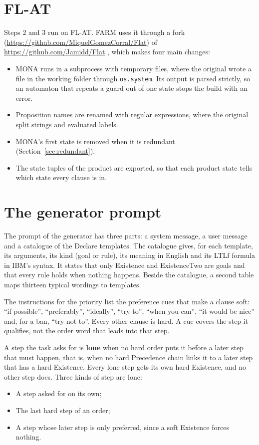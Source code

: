 \documentclass[11pt,english,listoffigures,listoftables]{tfgetsinf}
\begin{document}
\section{FL-AT}
Steps 2 and 3 run on FL-AT. FARM uses it through a fork (\url{https://github.com/MiquelGomezCorral/Flat}) of \url{https://github.com/Jamidd/Flat} \cite{flat_code}, which makes four main changes:
\begin{itemize}
    \item MONA runs in a subprocess with temporary files, where the original wrote a file in the working folder through \texttt{os.system}. Its output is parsed strictly, so an automaton that repeats a guard out of one state stops the build with an error.
    \item Proposition names are renamed with regular expressions, where the original split strings and evaluated labels.
    \item MONA's first state is removed when it is redundant (Section~\ref{sec:redundant}).
    \item The state tuples of the product are exported, so that each product state tells which state every clause is in.
\end{itemize}

\section{The generator prompt}
The prompt of the generator has three parts: a system message, a user message and a catalogue of the Declare templates. The catalogue gives, for each template, its arguments, its kind (goal or rule), its meaning in English and its LTLf formula in IBM's syntax. It states that only Existence and ExistenceTwo are goals and that every rule holds when nothing happens. Beside the catalogue, a second table maps thirteen typical wordings to templates.

The instructions for the priority list the preference cues that make a clause soft: ``if possible'', ``preferably'', ``ideally'', ``try to'', ``when you can'', ``it would be nice'' and, for a ban, ``try not to''. Every other clause is hard. A cue covers the step it qualifies, not the order word that leads into that step.

A step the task asks for is \textbf{lone} when no hard order puts it before a later step that must happen, that is, when no hard Precedence chain links it to a later step that has a hard Existence. Every lone step gets its own hard Existence, and no other step does. Three kinds of step are lone:
\begin{itemize}
    \item A step asked for on its own;
    \item The last hard step of an order;
    \item A step whose later step is only preferred, since a soft Existence forces nothing.
\end{itemize}
\end{document}
